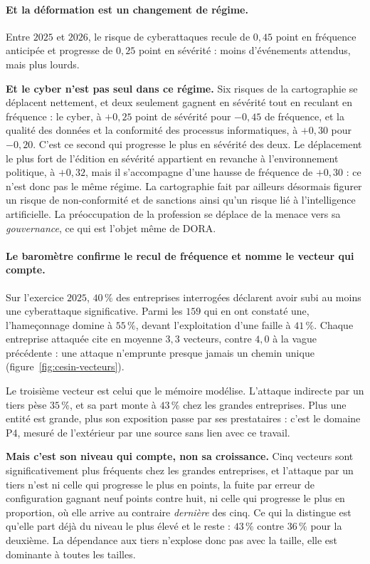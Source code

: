 \paragraph{Et la déformation est un changement de régime.} Entre $2025$ et $2026$, le risque de
cyberattaques recule de $0{,}45$ point en fréquence anticipée et progresse de $0{,}25$ point en
sévérité : moins d'événements attendus, mais plus lourds.

\textbf{Et le cyber n'est pas seul dans ce régime.} Six risques de la cartographie se déplacent
nettement, et deux seulement gagnent en sévérité tout en reculant en fréquence : le cyber, à
$+0{,}25$ point de sévérité pour $-0{,}45$ de fréquence, et la qualité des données et la
conformité des processus informatiques, à $+0{,}30$ pour $-0{,}20$. C'est ce second qui progresse
le plus en sévérité des deux. Le déplacement le plus fort de l'édition en sévérité appartient en
revanche à l'environnement politique, à $+0{,}32$, mais il s'accompagne d'une hausse de fréquence
de $+0{,}30$ : ce n'est donc pas le même régime. La cartographie fait par ailleurs désormais
figurer un risque de non-conformité et de sanctions ainsi qu'un risque lié à l'intelligence
artificielle. La préoccupation de la profession se déplace de la menace vers sa
\emph{gouvernance}, ce qui est l'objet même de DORA.

\paragraph{Le baromètre confirme le recul de fréquence et nomme le vecteur qui compte.} Sur
l'exercice $2025$, $40\,\%$ des entreprises interrogées déclarent avoir subi au moins une
cyberattaque significative. Parmi les $159$ qui en ont constaté une, l'hameçonnage domine à
$55\,\%$, devant l'exploitation d'une faille à $41\,\%$. Chaque entreprise attaquée cite en
moyenne $3{,}3$ vecteurs, contre $4{,}0$ à la vague précédente : une attaque n'emprunte presque
jamais un chemin unique (figure~\ref{fig:cesin-vecteurs}).

Le troisième vecteur est celui que le mémoire modélise. L'attaque indirecte par un tiers pèse
$35\,\%$, et sa part monte à $43\,\%$ chez les grandes entreprises. Plus une entité est grande,
plus son exposition passe par ses prestataires : c'est le domaine P4, mesuré de l'extérieur par
une source sans lien avec ce travail.

\textbf{Mais c'est son niveau qui compte, non sa croissance.} Cinq vecteurs sont significativement
plus fréquents chez les grandes entreprises, et l'attaque par un tiers n'est ni celle qui progresse
le plus en points, la fuite par erreur de configuration gagnant neuf points contre huit, ni celle
qui progresse le plus en proportion, où elle arrive au contraire \emph{dernière} des cinq. Ce qui
la distingue est qu'elle part déjà du niveau le plus élevé et le reste : $43\,\%$ contre $36\,\%$
pour la deuxième. La dépendance aux tiers n'explose donc pas avec la taille, elle est dominante à
toutes les tailles.

